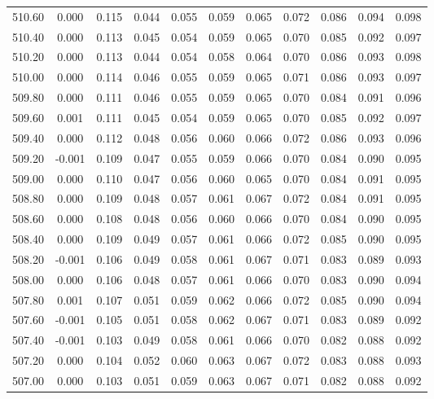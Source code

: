 \begin{longtable}{cccccccccc}
    510.60 &  0.000 &  0.115 &  0.044 &  0.055 &  0.059 &  0.065 &  0.072 &  0.086 &  0.094 &  0.098 \\
    510.40 &  0.000 &  0.113 &  0.045 &  0.054 &  0.059 &  0.065 &  0.070 &  0.085 &  0.092 &  0.097 \\
    510.20 &  0.000 &  0.113 &  0.044 &  0.054 &  0.058 &  0.064 &  0.070 &  0.086 &  0.093 &  0.098 \\
    510.00 &  0.000 &  0.114 &  0.046 &  0.055 &  0.059 &  0.065 &  0.071 &  0.086 &  0.093 &  0.097 \\
    509.80 &  0.000 &  0.111 &  0.046 &  0.055 &  0.059 &  0.065 &  0.070 &  0.084 &  0.091 &  0.096 \\
    509.60 &  0.001 &  0.111 &  0.045 &  0.054 &  0.059 &  0.065 &  0.070 &  0.085 &  0.092 &  0.097 \\
    509.40 &  0.000 &  0.112 &  0.048 &  0.056 &  0.060 &  0.066 &  0.072 &  0.086 &  0.093 &  0.096 \\
    509.20 & -0.001 &  0.109 &  0.047 &  0.055 &  0.059 &  0.066 &  0.070 &  0.084 &  0.090 &  0.095 \\
    509.00 &  0.000 &  0.110 &  0.047 &  0.056 &  0.060 &  0.065 &  0.070 &  0.084 &  0.091 &  0.095 \\
    508.80 &  0.000 &  0.109 &  0.048 &  0.057 &  0.061 &  0.067 &  0.072 &  0.084 &  0.091 &  0.095 \\
    508.60 &  0.000 &  0.108 &  0.048 &  0.056 &  0.060 &  0.066 &  0.070 &  0.084 &  0.090 &  0.095 \\
    508.40 &  0.000 &  0.109 &  0.049 &  0.057 &  0.061 &  0.066 &  0.072 &  0.085 &  0.090 &  0.095 \\
    508.20 & -0.001 &  0.106 &  0.049 &  0.058 &  0.061 &  0.067 &  0.071 &  0.083 &  0.089 &  0.093 \\
    508.00 &  0.000 &  0.106 &  0.048 &  0.057 &  0.061 &  0.066 &  0.070 &  0.083 &  0.090 &  0.094 \\
    507.80 &  0.001 &  0.107 &  0.051 &  0.059 &  0.062 &  0.066 &  0.072 &  0.085 &  0.090 &  0.094 \\
    507.60 & -0.001 &  0.105 &  0.051 &  0.058 &  0.062 &  0.067 &  0.071 &  0.083 &  0.089 &  0.092 \\
    507.40 & -0.001 &  0.103 &  0.049 &  0.058 &  0.061 &  0.066 &  0.070 &  0.082 &  0.088 &  0.092 \\
    507.20 &  0.000 &  0.104 &  0.052 &  0.060 &  0.063 &  0.067 &  0.072 &  0.083 &  0.088 &  0.093 \\
    507.00 &  0.000 &  0.103 &  0.051 &  0.059 &  0.063 &  0.067 &  0.071 &  0.082 &  0.088 &  0.092 \\

\end{longtable}
